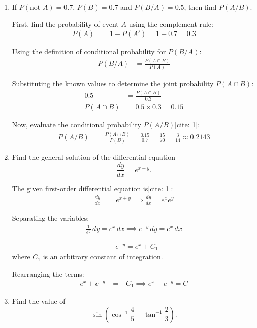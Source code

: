 \begin{enumerate}[label=\thesubsection.\arabic*, ref=\thesubsection.\theenumi]
\item If $P(\text{not }A)=0.7$, $P(B)=0.7$ and $P(B/A)=0.5$, then find $P(A/B)$.

\solution
First, find the probability of event $A$ using the complement rule:
\begin{align*}
	P(A) &= 1 - P(A') 
	= 1 - 0.7 
	= 0.3
\end{align*}

Using the definition of conditional probability for $P(B/A)$:
\begin{align*}
	P(B/A) &= \frac{P(A \cap B)}{P(A)}
\end{align*}

Substituting the known values to determine the joint probability $P(A \cap B)$:
\begin{align*}
	0.5 &= \frac{P(A \cap B)}{0.3} \\
	P(A \cap B) &= 0.5 \times 0.3 = 0.15
\end{align*}

Now, evaluate the conditional probability $P(A/B)$[cite: 1]:
\begin{align*}
	P(A/B) &= \frac{P(A \cap B)}{P(B)} 
	= \frac{0.15}{0.7} 
	= \frac{15}{70} 
	= \frac{3}{14} \approx 0.2143
\end{align*}

\item Find the general solution of the differential equation
\[
\frac{dy}{dx}=e^{x+y}.
\]

\solution
The given first-order differential equation is[cite: 1]:
\begin{align*}
	\frac{dy}{dx} &= e^{x+y} \implies
	\frac{dy}{dx} = e^x e^y
\end{align*}

Separating the variables:
\begin{align*}
	\frac{1}{e^y}\,dy = e^x\,dx \implies e^{-y}\,dy = e^x\,dx
\end{align*}

\begin{align*}
	-e^{-y} = e^x + C_1
\end{align*}
where $C_1$ is an arbitrary constant of integration.

Rearranging the terms:
\begin{align*}
	e^x + e^{-y} &= -C_1 \implies e^x + e^{-y} = C 
\end{align*}



\item Find the value of
\[
\sin\left(\cos^{-1}\frac45+\tan^{-1}\frac23\right).
\]


\end{enumerate}
